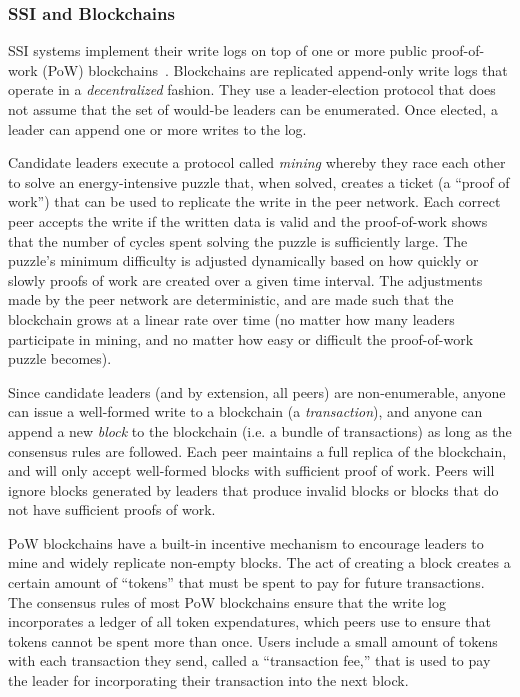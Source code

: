\subsubsection{SSI and Blockchains}

SSI systems implement their write logs on top of one or more public
proof-of-work (PoW) blockchains~\cite{bitcoin}.  Blockchains are replicated append-only write logs that
operate in a \emph{decentralized} fashion.  They use a leader-election protocol
that does not assume that the set of would-be leaders can be enumerated.  Once
elected, a leader can append one or more writes to the log.

Candidate leaders execute a protocol called \emph{mining} whereby they
race each other to solve an energy-intensive puzzle that, when
solved, creates a ticket (a ``proof of work'') that can be used to replicate the
write in the peer network.  Each correct peer accepts the write if the written
data is valid and the proof-of-work shows that the number of cycles spent solving the
puzzle is sufficiently large.
The puzzle's minimum difficulty is adjusted dynamically based on how quickly or
slowly proofs of work are created over a given time interval.  The adjustments
made by the peer network are deterministic, and are made such that the
blockchain grows at a linear rate over time (no matter how many leaders
participate in mining, and no matter how easy or difficult the proof-of-work puzzle
becomes).

Since candidate leaders (and by extension, all peers) are non-enumerable,
anyone can issue a well-formed write to a blockchain
(a \emph{transaction}), and anyone can append a new \emph{block} to the
blockchain (i.e. a bundle of transactions)
as long as the consensus rules are followed.  Each peer maintains a full replica
of the blockchain, and will only accept well-formed blocks with sufficient proof
of work.  Peers will ignore blocks generated by leaders that produce invalid
blocks or blocks that do not have sufficient proofs of work.

PoW blockchains have a built-in incentive mechanism to encourage leaders to mine
and widely replicate non-empty blocks.  The act of creating a block creates a
certain amount of ``tokens'' that must be spent to pay for future transactions.
The consensus rules of most PoW blockchains ensure that the write log
incorporates a ledger of all token expendatures, which peers use to ensure that
tokens cannot be spent more than once.  Users include a small amount of tokens
with each transaction they send, called a ``transaction fee,'' that is used to
pay the leader for incorporating their transaction into the next block.

